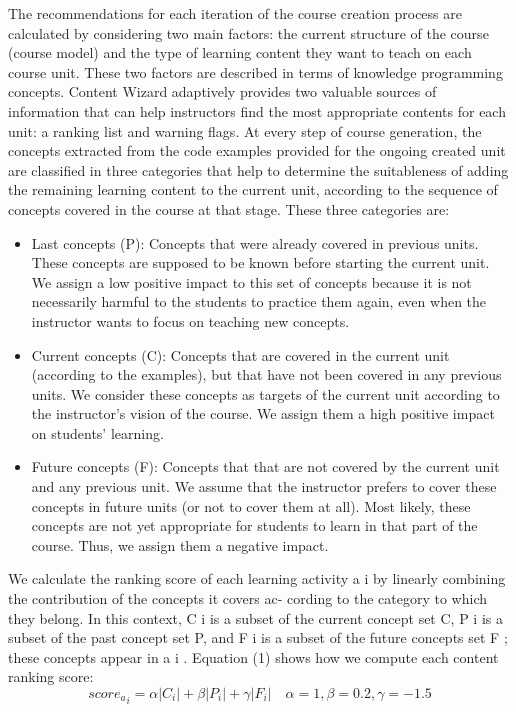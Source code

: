 \documentclass{sig-alternate}
\begin{document}
The recommendations for each iteration of the course creation
process are calculated by considering two main factors: the current
structure of the course (course model) and the type of learning
content they want to teach on each course unit. These two factors
are described in terms of knowledge programming concepts.
Content Wizard adaptively provides two valuable sources of
information that can help instructors find the most appropriate
contents for each unit: a ranking list and warning flags. At every
step of course generation, the concepts extracted from the code
examples provided for the ongoing created unit are classified in
three categories that help to determine the suitableness of adding
the remaining learning content to the current unit, according to
the sequence of concepts covered in the course at that stage. These
three categories are:
\begin{itemize}
\item Last concepts (P): Concepts that were already covered in previous
units. These concepts are supposed to be known before starting
the current unit. We assign a low positive impact to this set of
concepts because it is not necessarily harmful to the students to
practice them again, even when the instructor wants to focus on
teaching new concepts.
\item Current concepts (C): Concepts that are covered in the current
unit (according to the examples), but that have not been covered
in any previous units. We consider these concepts as targets of
the current unit according to the instructor’s vision of the course.
We assign them a high positive impact on students’ learning.
\item Future concepts (F): Concepts that that are not covered by the
current unit and any previous unit. We assume that the instructor
prefers to cover these concepts in future units (or not to cover
them at all). Most likely, these concepts are not yet appropriate
for students to learn in that part of the course. Thus, we assign
them a negative impact.
\end{itemize}
We calculate the ranking score of each learning activity a i by
linearly combining the contribution of the concepts it covers ac-
cording to the category to which they belong. In this context, C i
is a subset of the current concept set C, P i is a subset of the past
concept set P, and F i is a subset of the future concepts set F ; these
concepts appear in a i . Equation (1) shows how we compute each
content ranking score:
\begin{equation}
    {score_a}_i =  \alpha |C_i|+ \beta|P_i|+ \gamma|F_i|  \quad    
\alpha = 1, \beta = 0.2, \gamma = -1.5
\end{equation}
\end{document}
